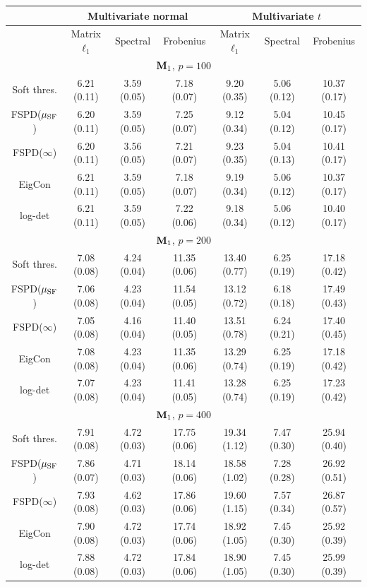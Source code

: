 \documentclass[times,sort&compress,3p]{elsarticle}
\begin{document}
\begin{table}[htb!]
{
\begin{center}
\begin{tabular}{c|ccc|ccc}
\hline
 & \multicolumn{3}{c|}{ Multivariate normal } &
 	\multicolumn{3}{c}{ Multivariate $t$  }\\
\hline
 & Matrix $\ell_1$ & Spectral & Frobenius & Matrix $\ell_1$ & Spectral & Frobenius \\
\hline
\multicolumn{7}{c}{${\bf M}_1$, $p = 100$} \\
Soft thres. & 6.21 (0.11)  & 3.59 (0.05)  & 7.18 (0.07) & 9.20 (0.35)  & 5.06 (0.12)  & 10.37 (0.17) \\
 FSPD($\mu_{\rm SF}$) & 6.20 (0.11)  & 3.59 (0.05)  & 7.25 (0.07) & 9.12 (0.34)  & 5.04 (0.12)  & 10.45 (0.17) \\
 FSPD($\infty$) & 6.20 (0.11)  & 3.56 (0.05)  & 7.21 (0.07) & 9.23 (0.35)  & 5.04 (0.13)  & 10.41 (0.17) \\
 EigCon & 6.21 (0.11)  & 3.59 (0.05)  & 7.18 (0.07) & 9.19 (0.34)  & 5.06 (0.12)  & 10.37 (0.17) \\
 log-det  & 6.21 (0.11)  & 3.59 (0.05)  & 7.22 (0.06) & 9.18 (0.34)  & 5.06 (0.12)  & 10.40 (0.17) \\
\multicolumn{7}{c}{${\bf M}_1$, $p = 200$} \\
Soft thres. & 7.08 (0.08)  & 4.24 (0.04)  & 11.35 (0.06) & 13.40 (0.77)  & 6.25 (0.19)  & 17.18 (0.42) \\
 FSPD($\mu_{\rm SF}$) & 7.06 (0.08)  & 4.23 (0.04)  & 11.54 (0.05) & 13.12 (0.72)  & 6.18 (0.18)  & 17.49 (0.43) \\
 FSPD($\infty$) & 7.05 (0.08)  & 4.16 (0.04)  & 11.40 (0.05) & 13.51 (0.78)  & 6.24 (0.21)  & 17.40 (0.45) \\
 EigCon & 7.08 (0.08)  & 4.23 (0.04)  & 11.35 (0.06) & 13.29 (0.74)  & 6.25 (0.19)  & 17.18 (0.42) \\
 log-det  & 7.07 (0.08)  & 4.23 (0.04)  & 11.41 (0.05) & 13.28 (0.74)  & 6.25 (0.19)  & 17.23 (0.42) \\
\multicolumn{7}{c}{${\bf M}_1$, $p = 400$} \\
Soft thres. & 7.91 (0.08)  & 4.72 (0.03)  & 17.75 (0.06) & 19.34 (1.12)  & 7.47 (0.30)  & 25.94 (0.40) \\
 FSPD($\mu_{\rm SF}$) & 7.86 (0.07)  & 4.71 (0.03)  & 18.14 (0.06) & 18.58 (1.02)  & 7.28 (0.28)  & 26.92 (0.51) \\
 FSPD($\infty$) & 7.93 (0.08)  & 4.62 (0.03)  & 17.86 (0.06) & 19.60 (1.15)  & 7.57 (0.34)  & 26.87 (0.57) \\
 EigCon & 7.90 (0.08)  & 4.72 (0.03)  & 17.74 (0.06) & 18.92 (1.05)  & 7.45 (0.30)  & 25.92 (0.39) \\
 log-det  & 7.88 (0.08)  & 4.72 (0.03)  & 17.84 (0.06) & 18.90 (1.05)  & 7.45 (0.30)  & 25.99 (0.39) \\
\hline


\end{tabular}
\end{center}}
\end{table}
\end{document}
